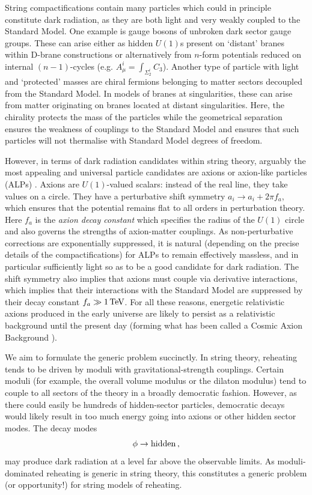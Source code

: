 String compactifications contain many particles which could in principle constitute dark radiation, as they are both light and very weakly coupled to the Standard Model. One example is gauge bosons of unbroken dark sector gauge groups. These can arise either as hidden $U(1)$s present on `distant' branes within D-brane constructions or alternatively from $n$-form potentials reduced on internal $(n-1)$-cycles (e.g. $A^i_\mu = \int_{\Sigma_2^i} C_3$). Another type of particle with light and `protected' masses are chiral fermions belonging to matter sectors decoupled from the Standard Model. In models of branes at singularities, these can arise from matter originating on branes located at distant singularities. Here, the chirality protects the mass of the particles while the geometrical separation ensures the weakness of couplings to the Standard Model and ensures that such particles will not thermalise with Standard Model degrees of freedom.

However, in terms of dark radiation candidates within string theory, arguably the most appealing and universal particle candidates are axions or axion-like particles (ALPs) \cite{Svrcek:2006yi, Arvanitaki:2009fg, Cicoli:2012sz, Demirtas:2018akl}. Axions are $U(1)$-valued scalars: instead of the real line, they take values on a circle. They have a perturbative shift symmetry $a_i \to a_i + 2 \pi f_a$, which ensures that the potential remains flat to all orders in perturbation theory. Here $f_a$ is the \emph{axion decay constant} which specifies the radius of the $U(1)$ circle and also governs the strengths of axion-matter couplings. As non-perturbative corrections are exponentially suppressed, it is natural (depending on the precise details of the compactifications) for ALPs to remain effectively massless, and in particular sufficiently light so as to be a good candidate for dark radiation. The shift symmetry also implies that axions must couple via derivative interactions, which implies that their interactions with the Standard Model are suppressed by their decay constant $f_a \gg 1\, \rm{TeV}$. For all these reasons, energetic relativistic axions produced in the early universe are likely to persist as a relativistic background until the present day (forming what has been called a Cosmic Axion Background \cite{13053603, 210109287}).

We aim to formulate the generic problem succinctly. In string theory, reheating tends to be driven by moduli with gravitational-strength couplings. Certain moduli (for example, the overall volume modulus or the dilaton modulus) tend to couple to all sectors of the theory in a broadly democratic fashion. However, as there could easily be hundreds of hidden-sector particles, 
democratic decays would likely result in too much energy going into axions or other hidden sector modes. The decay modes 
\begin{equation}
\phi \to {\rm hidden}\,,
\end{equation} 
may produce dark radiation at a level far above the observable limits. As moduli-dominated reheating is generic in string theory, this constitutes a generic problem (or opportunity!) for string models of reheating. 

